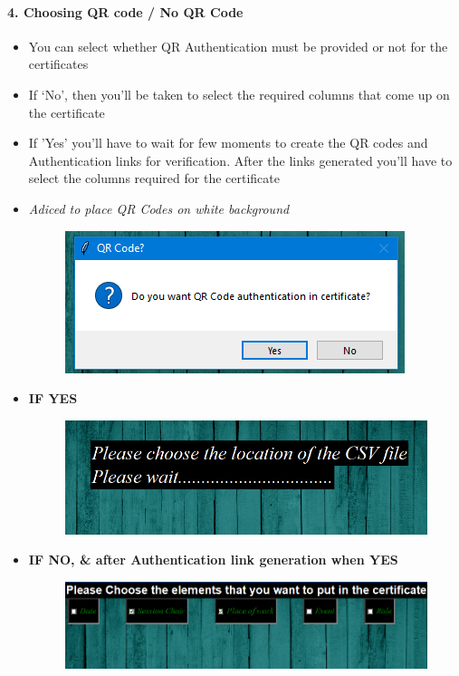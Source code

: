 \newpage
\paragraph{4. Choosing QR code / No QR Code}
\begin{itemize}
	\item You can select whether QR Authentication must be provided or not for the certificates
	\item If `No', then you'll be taken to select the required columns that come up on the certificate
	\item If 'Yes' you'll have to wait for few moments to create the QR codes and Authentication links for verification. After the links generated you'll have to select the columns required for the certificate
	\item \textit{Adiced to place QR Codes on white background}


\begin{figure}[H]
	\centering
	\includegraphics[width=0.6\linewidth]{"images/generation_qr_nqr/Screenshot (39)"}
	\label{fig:screenshot-39}
\end{figure}

	\item \large\textbf{IF YES}

\begin{figure}[H]
	\centering
	\includegraphics[width=0.7\linewidth]{"images/generation_qr_nqr/Screenshot (51)"}
	\label{fig:screenshot-51}
\end{figure}

	\item \large\textbf{IF NO, \& after Authentication link generation when YES}
	
\begin{figure}[H]
	\centering
	\includegraphics[width=0.7\linewidth]{"images/generation_qr_nqr/Screenshot (41)"}
	\label{fig:screenshot-41}
\end{figure}


\end{itemize}

